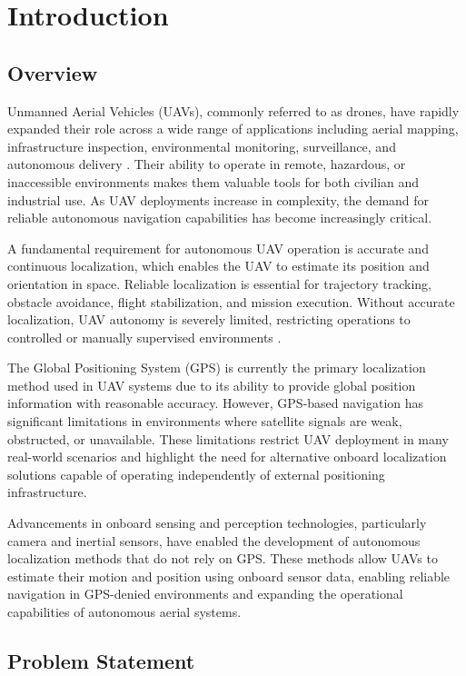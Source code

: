 \section{Introduction}

\subsection{Overview}

Unmanned Aerial Vehicles (UAVs), commonly referred to as drones, have rapidly expanded their role across a wide range of applications including aerial mapping, infrastructure inspection, environmental monitoring, surveillance, and autonomous delivery \cite{ref1,ref2}. Their ability to operate in remote, hazardous, or inaccessible environments makes them valuable tools for both civilian and industrial use. As UAV deployments increase in complexity, the demand for reliable autonomous navigation capabilities has become increasingly critical.

A fundamental requirement for autonomous UAV operation is accurate and continuous localization, which enables the UAV to estimate its position and orientation in space. Reliable localization is essential for trajectory tracking, obstacle avoidance, flight stabilization, and mission execution. Without accurate localization, UAV autonomy is severely limited, restricting operations to controlled or manually supervised environments \cite{ref3}.

The Global Positioning System (GPS) is currently the primary localization method used in UAV systems due to its ability to provide global position information with reasonable accuracy. However, GPS-based navigation has significant limitations in environments where satellite signals are weak, obstructed, or unavailable. These limitations restrict UAV deployment in many real-world scenarios and highlight the need for alternative onboard localization solutions capable of operating independently of external positioning infrastructure.

Advancements in onboard sensing and perception technologies, particularly camera and inertial sensors, have enabled the development of autonomous localization methods that do not rely on GPS. These methods allow UAVs to estimate their motion and position using onboard sensor data, enabling reliable navigation in GPS-denied environments and expanding the operational capabilities of autonomous aerial systems.

\subsection{Problem Statement}

